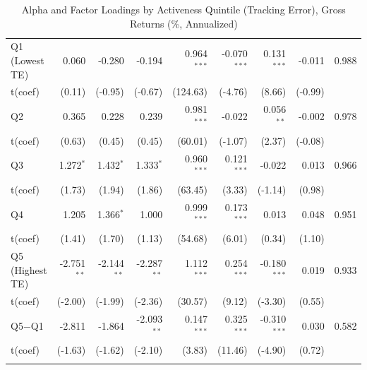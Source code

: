 \begin{table}[!htbp]
{\begin{tabular*}{\linewidth}{@{\extracolsep{\fill}}lrrrrrrrr}
\hspace{1em}Q1 (Lowest TE) & 0.060 & -0.280 & -0.194 & 0.964$^{***}$ & -0.070$^{***}$ & 0.131$^{***}$ & -0.011 & 0.988\\
\hspace{1em}t(coef) & (0.11) & (-0.95) & (-0.67) & (124.63) & (-4.76) & (8.66) & (-0.99) & \\
\hspace{1em}Q2 & 0.365 & 0.228 & 0.239 & 0.981$^{***}$ & -0.022 & 0.056$^{**}$ & -0.002 & 0.978\\
\hspace{1em}t(coef) & (0.63) & (0.45) & (0.45) & (60.01) & (-1.07) & (2.37) & (-0.08) & \\
\hspace{1em}Q3 & 1.272$^{*}$ & 1.432$^{*}$ & 1.333$^{*}$ & 0.960$^{***}$ & 0.121$^{***}$ & -0.022 & 0.013 & 0.966\\
\hspace{1em}t(coef) & (1.73) & (1.94) & (1.86) & (63.45) & (3.33) & (-1.14) & (0.98) & \\
\hspace{1em}Q4 & 1.205 & 1.366$^{*}$ & 1.000 & 0.999$^{***}$ & 0.173$^{***}$ & 0.013 & 0.048 & 0.951\\
\hspace{1em}t(coef) & (1.41) & (1.70) & (1.13) & (54.68) & (6.01) & (0.34) & (1.10) & \\
\hspace{1em}Q5 (Highest TE) & -2.751$^{**}$ & -2.144$^{**}$ & -2.287$^{**}$ & 1.112$^{***}$ & 0.254$^{***}$ & -0.180$^{***}$ & 0.019 & 0.933\\
\hspace{1em}t(coef) & (-2.00) & (-1.99) & (-2.36) & (30.57) & (9.12) & (-3.30) & (0.55) & \\
\hspace{1em}Q5$-$Q1 & -2.811 & -1.864 & -2.093$^{**}$ & 0.147$^{***}$ & 0.325$^{***}$ & -0.310$^{***}$ & 0.030 & 0.582\\
\hspace{1em}t(coef) & (-1.63) & (-1.62) & (-2.10) & (3.83) & (11.46) & (-4.90) & (0.72) & \\
\addlinespace[0.3em]
\hline
\bottomrule
\end{tabular*}%
}\sbefit
\fi
\setlength{\tabletempwidth}{\wd\tabletempbox}
\ifdim\tabletempwidth>\linewidth\setlength{\tabletempwidth}{\linewidth}\fi
\begin{minipage}{\tabletempwidth}
\captionsetup{width=\linewidth}
\caption{Alpha and Factor Loadings by Activeness Quintile (Tracking Error), Gross Returns (\%, Annualized)}\label{tab:activeness_alpha_te}

\end{minipage}
\end{table}
